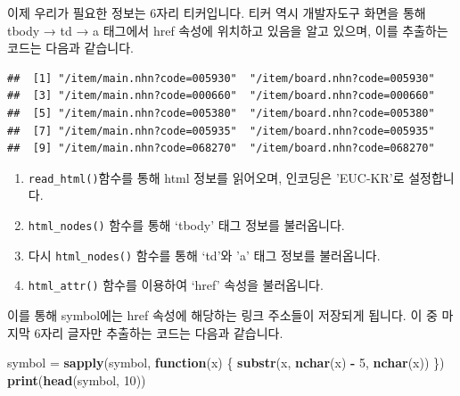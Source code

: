 \documentclass[]{book}
\newenvironment{Shaded}{\begin{snugshade}}{\end{snugshade}}
\newcommand{\ControlFlowTok}[1]{\textcolor[rgb]{0.13,0.29,0.53}{\textbf{#1}}}
\newcommand{\DataTypeTok}[1]{\textcolor[rgb]{0.13,0.29,0.53}{#1}}
\newcommand{\DecValTok}[1]{\textcolor[rgb]{0.00,0.00,0.81}{#1}}
\newcommand{\KeywordTok}[1]{\textcolor[rgb]{0.13,0.29,0.53}{\textbf{#1}}}
\newcommand{\NormalTok}[1]{#1}
\newcommand{\OperatorTok}[1]{\textcolor[rgb]{0.81,0.36,0.00}{\textbf{#1}}}
\newcommand{\StringTok}[1]{\textcolor[rgb]{0.31,0.60,0.02}{#1}}
\providecommand{\tightlist}{%
  \setlength{\itemsep}{0pt}\setlength{\parskip}{0pt}}
\begin{document}
이제 우리가 필요한 정보는 6자리 티커입니다. 티커 역시 개발자도구 화면을 통해 tbody → td → a 태그에서 href 속성에 위치하고 있음을 알고 있으며, 이를 추출하는 코드는 다음과 같습니다.

\begin{Shaded}
\end{Shaded}

\begin{verbatim}
##  [1] "/item/main.nhn?code=005930"  "/item/board.nhn?code=005930"
##  [3] "/item/main.nhn?code=000660"  "/item/board.nhn?code=000660"
##  [5] "/item/main.nhn?code=005380"  "/item/board.nhn?code=005380"
##  [7] "/item/main.nhn?code=005935"  "/item/board.nhn?code=005935"
##  [9] "/item/main.nhn?code=068270"  "/item/board.nhn?code=068270"
\end{verbatim}

\begin{enumerate}
\def\labelenumi{\arabic{enumi}.}
\tightlist
\item
  \texttt{read\_html()}함수를 통해 html 정보를 읽어오며, 인코딩은 'EUC-KR'로 설정합니다.
\item
  \texttt{html\_nodes()} 함수를 통해 `tbody' 태그 정보를 불러옵니다.
\item
  다시 \texttt{html\_nodes()} 함수를 통해 `td'와 'a' 태그 정보를 불러옵니다.
\item
  \texttt{html\_attr()} 함수를 이용하여 `href' 속성을 불러옵니다.
\end{enumerate}

이를 통해 symbol에는 href 속성에 해당하는 링크 주소들이 저장되게 됩니다. 이 중 마지막 6자리 글자만 추출하는 코드는 다음과 같습니다.

\begin{Shaded}
\begin{Highlighting}[]
\NormalTok{symbol =}\StringTok{ }\KeywordTok{sapply}\NormalTok{(symbol, }\ControlFlowTok{function}\NormalTok{(x) \{}
        \KeywordTok{substr}\NormalTok{(x, }\KeywordTok{nchar}\NormalTok{(x) }\OperatorTok{-}\StringTok{ }\DecValTok{5}\NormalTok{, }\KeywordTok{nchar}\NormalTok{(x)) }
\NormalTok{      \})}
\KeywordTok{print}\NormalTok{(}\KeywordTok{head}\NormalTok{(symbol, }\DecValTok{10}\NormalTok{))}
\end{Highlighting}
\end{Shaded}
\end{document}
